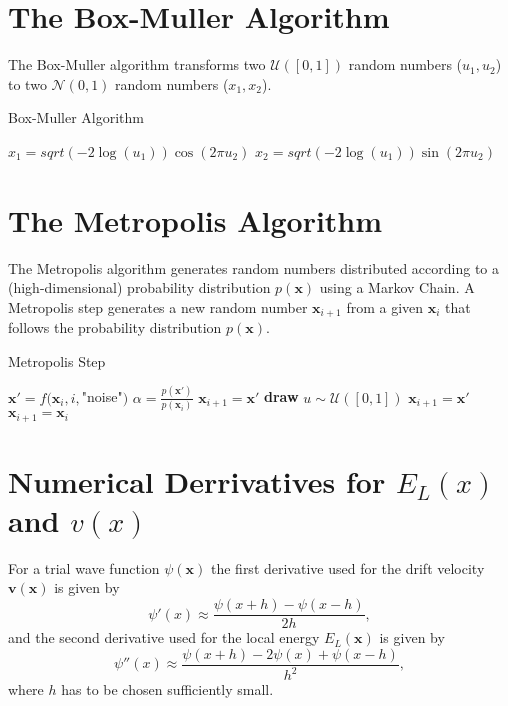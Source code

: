 \documentclass [12pt]{report}
\begin{document}
\begin{appendices}
\chapter{The Box-Muller Algorithm} \label{appendixA}
The Box-Muller algorithm transforms two $\mathcal{U}([0,1])$ random numbers ($u_1, u_2$) to two $\mathcal{N}(0,1)$ random numbers ($x_1, x_2$).

\begin{algorithm}
\caption{Box-Muller Algorithm}\label{box-muller}
\begin{algorithmic}[1]
\State $x_1 = sqrt(-2\log(u_1))\cos(2\pi u_2)$
\State $x_2 = sqrt(-2\log(u_1))\sin(2\pi u_2)$
\EndProcedure
\end{algorithmic}
\end{algorithm}

\chapter{The Metropolis Algorithm} \label{appendixB}
The Metropolis algorithm generates random numbers distributed according to a (high-dimensional) probability distribution $p(\bm{x})$ using a Markov Chain. A Metropolis step generates a new random number $\bm{x}_{i+1}$ from a given $\bm{x}_i$ that follows the probability distribution $p(\bm{x})$.

\begin{algorithm}
\caption{Metropolis Step}\label{metropolis}
\begin{algorithmic}[1]
\State $\bm{x}' = f(\bm{x}_i,i,$"noise"$)$ 
\State $\alpha = \frac{p(\bm{x}')}{p(\bm{x}_i)}$
	\State $\bm{x}_{i+1} = \bm{x}'$ 
\Else
	\State \textbf{draw} $u \sim \mathcal{U}([0,1])$
		\State $\bm{x}_{i+1} = \bm{x}'$ 
	\Else
		\State $\bm{x}_{i+1} = \bm{x}_i$ 
	\EndIf
\EndIf 
\EndProcedure
\end{algorithmic}
\end{algorithm}

\chapter{Numerical Derrivatives for $E_L(x)$ and $v(x)$} \label{appendixC}
For a trial wave function $\psi(\bm{x})$ the first derivative used for the drift velocity $\bm{v}(\bm{x})$ is given by
\begin{equation}
\psi'(x) \approx \frac{\psi(x + h) - \psi(x - h)}{2h},
\end{equation}
and the second derivative used for the local energy $E_L(\bm{x})$ is given by
\begin{equation}
\psi''(x) \approx \frac{\psi(x + h) - 2 \psi(x) + \psi(x - h)}{h^2},
\end{equation}
where $h$ has to be chosen sufficiently small.

\end{appendices}



\end{document}
